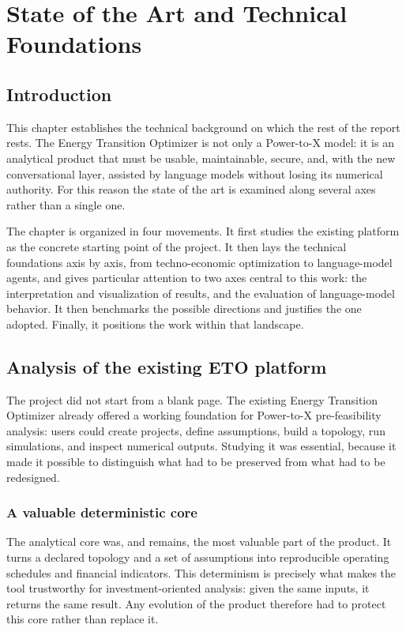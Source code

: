 \chapter{State of the Art and Technical Foundations}
\label{chap:background}

\section*{Introduction}

This chapter establishes the technical background on which the rest of the
report rests. The Energy Transition Optimizer is not only a Power-to-X model: it
is an analytical product that must be usable, maintainable, secure, and, with the
new conversational layer, assisted by language models without losing its
numerical authority. For this reason the state of the art is examined along
several axes rather than a single one.

The chapter is organized in four movements. It first studies the existing
platform as the concrete starting point of the project. It then lays the
technical foundations axis by axis, from techno-economic optimization to
language-model agents, and gives particular attention to two axes central to
this work: the interpretation and visualization of
results, and the evaluation of language-model behavior. It then benchmarks the
possible directions and justifies the one adopted. Finally, it positions the
work within that landscape.

\section{Analysis of the existing ETO platform}
\label{sec:existing}

The project did not start from a blank page. The existing Energy Transition
Optimizer already offered a working foundation for Power-to-X pre-feasibility
analysis: users could create projects, define assumptions, build a topology, run
simulations, and inspect numerical outputs. Studying it was essential, because it
made it possible to distinguish what had to be preserved from what had to be
redesigned.



\subsection{A valuable deterministic core}

The analytical core was, and remains, the most valuable part of the product. It
turns a declared topology and a set of assumptions into reproducible operating
schedules and financial indicators. This determinism is precisely what makes the
tool trustworthy for investment-oriented analysis: given the same inputs, it
returns the same result. Any evolution of the product therefore had to protect
this core rather than replace it.

